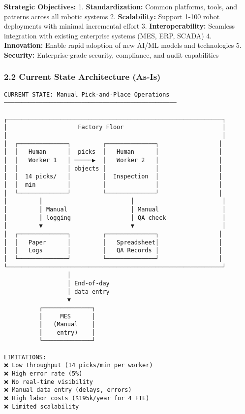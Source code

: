 \documentclass[
]{article}
\begin{document}
\textbf{Strategic Objectives:} 1. \textbf{Standardization:} Common
platforms, tools, and patterns across all robotic systems 2.
\textbf{Scalability:} Support 1-100 robot deployments with minimal
incremental effort 3. \textbf{Interoperability:} Seamless integration
with existing enterprise systems (MES, ERP, SCADA) 4.
\textbf{Innovation:} Enable rapid adoption of new AI/ML models and
technologies 5. \textbf{Security:} Enterprise-grade security,
compliance, and audit capabilities

\hypertarget{current-state-architecture-as-is}{%
\subsubsection{2.2 Current State Architecture
(As-Is)}\label{current-state-architecture-as-is}}

\begin{verbatim}
CURRENT STATE: Manual Pick-and-Place Operations
─────────────────────────────────────────────────

┌─────────────────────────────────────────────────────────────┐
│                    Factory Floor                            │
│                                                             │
│  ┌──────────────┐         ┌──────────────┐                 │
│  │   Human      │  picks  │   Human      │                 │
│  │   Worker 1   │ ─────▶  │   Worker 2   │                 │
│  │              │ objects │              │                 │
│  │  14 picks/   │         │  Inspection  │                 │
│  │  min         │         │              │                 │
│  └──────────────┘         └──────────────┘                 │
│         │                         │                         │
│         │ Manual                  │ Manual                  │
│         │ logging                 │ QA check                │
│         ▼                         ▼                         │
│  ┌──────────────┐         ┌──────────────┐                 │
│  │   Paper      │         │   Spreadsheet│                 │
│  │   Logs       │         │   QA Records │                 │
│  └──────────────┘         └──────────────┘                 │
└─────────────────────────────────────────────────────────────┘
                  │
                  │ End-of-day
                  │ data entry
                  ▼
          ┌──────────────┐
          │     MES      │
          │   (Manual    │
          │    entry)    │
          └──────────────┘

LIMITATIONS:
❌ Low throughput (14 picks/min per worker)
❌ High error rate (5%)
❌ No real-time visibility
❌ Manual data entry (delays, errors)
❌ High labor costs ($195k/year for 4 FTE)
❌ Limited scalability
\end{verbatim}
\end{document}

